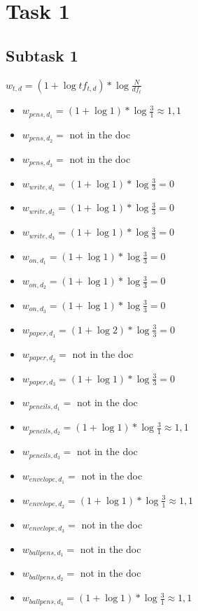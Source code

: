 \documentclass[a4paper]{scrartcl}
\begin{document}
    
\section*{Task 1}
\subsection{Subtask 1}
\begin{center}
    $w_{t,d}=(1+\log tf_{t,d})*\log \frac{N}{df_t}$
\end{center}
\begin{itemize}
    \item $w_{pens, d_1} = (1+\log 1) * \log \frac{3}{1} \approx  1,1$
    \item $w_{pens, d_2} = $ not in the doc
    \item $w_{pens, d_3} = $ not in the doc
    \item $w_{write, d_1} = (1+\log 1) * \log \frac{3}{3} = 0$
    \item $w_{write, d_2} = (1+\log 1) * \log \frac{3}{3} = 0$
    \item $w_{write, d_3} = (1+\log 1) * \log \frac{3}{3} = 0$
    \item $w_{on, d_1} = (1+\log 1) * \log \frac{3}{3} = 0$
    \item $w_{on, d_2} = (1+\log 1) * \log \frac{3}{3} = 0$
    \item $w_{on, d_3} = (1+\log 1) * \log \frac{3}{3} = 0$
    \item $w_{paper, d_1} = (1+\log 2) * \log \frac{3}{3} = 0$
    \item $w_{paper, d_2} = $ not in the doc
    \item $w_{paper, d_3} = (1+\log 1) * \log \frac{3}{3} = 0$
    \item $w_{pencils, d_1} = $ not in the doc
    \item $w_{pencils, d_2} = (1+\log 1) * \log \frac{3}{1} \approx 1,1$
    \item $w_{pencils, d_3} = $ not in the doc
    \item $w_{envelope, d_1} = $ not in the doc
    \item $w_{envelope, d_2} = (1+\log 1) * \log \frac{3}{1} \approx 1,1$
    \item $w_{envelope, d_3} = $ not in the doc
    \item $w_{ballpens, d_1} = $ not in the doc
    \item $w_{ballpens, d_2} = $ not in the doc
    \item $w_{ballpens, d_3} = (1+\log 1) * \log \frac{3}{1} \approx 1,1$
\end{itemize}
\end{document}
